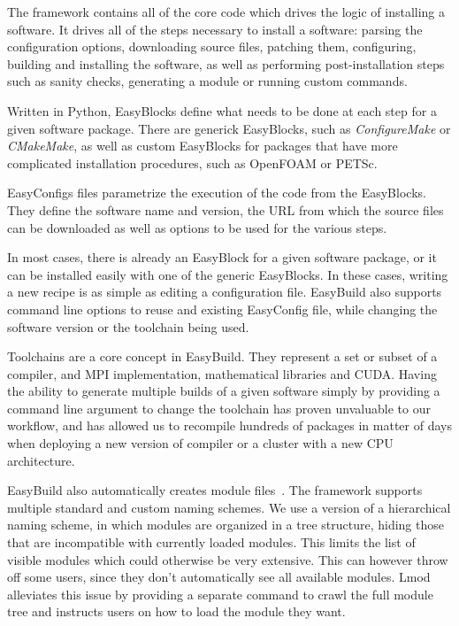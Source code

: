 \documentclass[sigconf]{acmart}
\begin{document}
The framework contains all of the core code which drives the logic of installing a software. It drives all of the steps necessary to install a software: parsing the configuration options, downloading source files, patching them, configuring, building and installing the software, as well as performing post-installation steps such as sanity checks, generating a module or running custom commands. 

Written in Python, EasyBlocks define what needs to be done at each step for a given software package. There are generick EasyBlocks, such as {\it ConfigureMake} or {\it CMakeMake}, as well as custom EasyBlocks for packages that have more complicated installation procedures, such as OpenFOAM or PETSc. 

EasyConfigs files parametrize the execution of the code from the EasyBlocks. They define the software name and version, the URL from which the source files can be downloaded as well as options to be used for the various steps. 

In most cases, there is already an EasyBlock for a given software package, or it can be installed easily with one of the generic EasyBlocks. In these cases, writing a new recipe is as simple as editing a configuration file. EasyBuild also supports command line options to reuse and existing EasyConfig file, while changing the software version or the toolchain being used. 

Toolchains are a core concept in EasyBuild. They represent a set or subset of a compiler, and MPI implementation, mathematical libraries and CUDA. Having the ability to generate multiple builds of a given software simply by providing a command line argument to change the toolchain has proven unvaluable to our workflow, and has allowed us to recompile hundreds of packages in matter of days when deploying a new version of compiler or a cluster with a new CPU architecture. 

EasyBuild also automatically creates module files~\cite{Modules1991,Modules1996,Lmod}. The framework supports multiple standard and custom naming schemes. We use a version of a hierarchical naming scheme, in which modules are organized in a tree structure, hiding those that are incompatible with currently loaded modules. This limits the list of visible modules which could otherwise be very extensive. This can however throw off some users, since they don’t automatically see all available modules. Lmod~\cite{Lmod} alleviates this issue by providing a separate command to crawl the full module tree and instructs users on how to load the module they want.
\end{document}

